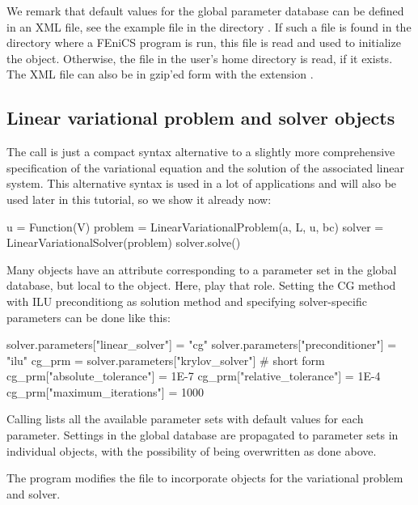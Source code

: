 We remark that default values for the global parameter database can be
defined in an XML file, see the example file
 in the directory
.  If such a file is found in the directory
where a FEniCS program is run, this file is read and used to
initialize the  object. Otherwise, the file
 in the user's home directory is
read, if it exists.  The XML file can also be in gzip'ed form with the
extension .

\subsection{Linear variational problem and solver objects}
\label{langtangen:poisson1:solver:problem}

The  call
is just a compact syntax alternative to a slightly more comprehensive
specification of the variational equation
and the solution of the associated linear system.
This alternative syntax is used in a lot of \fenics{} applications
and will also be used later in this tutorial, so we show it already now:
\begin{python}
u = Function(V)
problem = LinearVariationalProblem(a, L, u, bc)
solver  = LinearVariationalSolver(problem)
solver.solve()
\end{python}

Many objects have an attribute  corresponding to
a parameter set in the global  database,
but local to the object. Here,  play that
role. Setting the CG method with ILU preconditiong as solution
method and specifying solver-specific parameters can be done
like this:
\begin{python}
solver.parameters["linear_solver"] = "cg"
solver.parameters["preconditioner"] = "ilu"
cg_prm = solver.parameters["krylov_solver"] # short form
cg_prm["absolute_tolerance"] = 1E-7
cg_prm["relative_tolerance"] = 1E-4
cg_prm["maximum_iterations"] = 1000
\end{python}
Calling  lists all the available
parameter sets with default values for each parameter.
Settings in the global  database are
propagated to parameter sets in individual objects, with the
possibility of being overwritten as done above.

The  program modifies the  file
to incorporate objects for the variational problem and solver.


